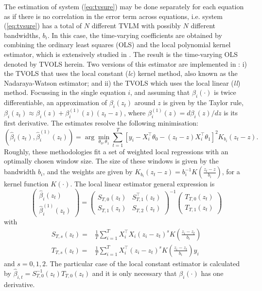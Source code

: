 The estimation of system (\ref{eq:tvsure}) may be done separately for each equation as if there is no correlation in the error term across equations, i.e. system (\ref{eq:tvsure}) has a total of $N$ different TVLM with possibly $N$ different bandwidths, $b_i$. In this case, the time-varying coefficients are obtained by combining the ordinary least squares (OLS) and the local polynomial kernel estimator, which is extensively studied in \citet{FanGijbels1996}. The result is the time-varying OLS denoted by TVOLS herein. Two versions of this estimator are implemented in : i) the TVOLS that uses the local constant (\emph{lc}) kernel method, also known as the Nadaraya-Watson estimator; and ii) the TVOLS which uses the local linear (\emph{ll}) method. Focussing in the single equation $i$, and assuming that $\beta_i(\cdot)$ is twice differentiable, an approximation of $\beta_i(z_t)$ around $z$ is given by the Taylor rule, $\beta_i(z_t) \approx \beta_i(z) + \beta_i^{(1)}(z) (z_t -z)$, where $\beta_i^{(1)}(z) = d\beta_i(z)/dz$ is its first derivative. The estimates resolve the following minimisation:
$$
(\hat \beta_i(z_t), \hat \beta_i^{(1)}(z_t))= \arg \min_{\theta_0, \theta_1} \sum_{t=1}^T \left[ y_i - X_i^\top \theta_0 - (z_t -z) X_i^\top\theta_1\right]^2 K_{b_i}(z_t -z). 
$$
Roughly, these methodologies fit a set of weighted local regressions with an optimally chosen window size. The size of these windows is given by the bandwidth $b_i$, and the weights are given by $K_{b_i}(z_t -z)= b_i^{-1} K(\frac{z_t-z}{b_i})$, for a kernel function $K(\cdot)$. The local linear estimator general expression is
\begin{equation}
\left(\begin{array}{c} \hat\beta_{i}(z_t)\\
\hat\beta_{i}^{(1)}(z_t) \end{array}\right) =
\left (\begin{array}{cc} S_{T,0}(z_t) & {S^\top_{T,1}}(z_t)\\
S_{T,1}(z_t) & S_{T,2}(z_t)\end{array}\right)^{-1} \left (\begin{array}{c} T_{T,0}(z_t) \\
T_{T,1}(z_t)\end{array}\right)
\label{eq:tvols}
\end{equation}
with
\begin{align*}
S_{T, s}(z_t) = &\frac{1}{T}\sum_{i=1}^T X_i^\top X_i (z_i -z_t)^s K\left(\frac{z_i -z_t}{b_i}\right) \\
T_{T, s}(z_t) = &\frac{1}{T}\sum_{i=1}^T X_i^{\top} (z_i - z_t)^s K\left(\frac{z_i -z_t}{b_i}\right) y_i
\end{align*}
and $s= 0, 1, 2$. The particular case of the local constant estimator is calculated by $\hat\beta_{i,t} = S_{T,0}^{-1}(z_t) T_{T, 0} (z_t)$ and it is only necessary that $\beta_i(\cdot)$ has one derivative.

